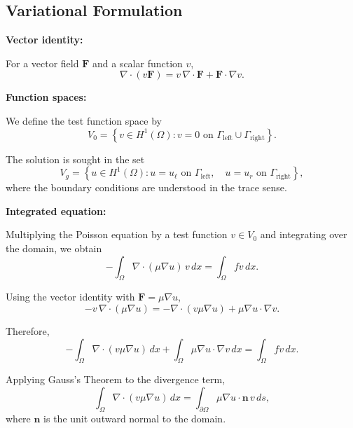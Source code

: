 \documentclass{article}
\begin{document}
	\subsection*{Variational Formulation}
	
	\noindent \textbf{Vector identity:}
	
	For a vector field $\mathbf{F}$ and a scalar function $v$,
	\begin{equation*}
		\nabla\cdot(v\mathbf{F})
		=
		v\,\nabla\cdot\mathbf{F}
		+
		\mathbf{F}\cdot\nabla v.
	\end{equation*}
	
	\noindent \textbf{Function spaces:}
	
	We define the test function space by
	\begin{equation*}
		V_0
		=
		\left\{
		v\in H^1(\Omega):
		v=0 \text{ on }
		\Gamma_{\mathrm{left}}\cup\Gamma_{\mathrm{right}}
		\right\}.
	\end{equation*}
	
	The solution is sought in the set
	\begin{equation*}
		V_g
		=
		\left\{
		u\in H^1(\Omega):
		u=u_\ell \text{ on }\Gamma_{\mathrm{left}},
		\quad
		u=u_r \text{ on }\Gamma_{\mathrm{right}}
		\right\},
	\end{equation*}
	where the boundary conditions are understood in the trace sense.
	
	\noindent \textbf{Integrated equation:}
	
	Multiplying the Poisson equation by a test function $v\in V_0$
	and integrating over the domain, we obtain
	\begin{equation}
		-\int_\Omega
		\nabla\cdot(\mu\nabla u)\,v\,dx
		=
		\int_\Omega fv\,dx.
		\label{eq:poisson-integrada}
	\end{equation}
	
	Using the vector identity with $\mathbf{F}=\mu\nabla u$,
	\begin{equation*}
		-v\,\nabla\cdot(\mu\nabla u)
		=
		-\nabla\cdot(v\mu\nabla u)
		+
		\mu\nabla u\cdot\nabla v.
	\end{equation*}
	
	Therefore,
	\begin{equation*}
		-\int_\Omega
		\nabla\cdot(v\mu\nabla u)\,dx
		+
		\int_\Omega
		\mu\nabla u\cdot\nabla v\,dx
		=
		\int_\Omega fv\,dx.
	\end{equation*}
	
	Applying Gauss's Theorem to the divergence term,
	\begin{equation*}
		\int_\Omega
		\nabla\cdot(v\mu\nabla u)\,dx
		=
		\int_{\partial\Omega}
		\mu\nabla u\cdot\mathbf{n}\,v\,ds,
	\end{equation*}
	where $\mathbf{n}$ is the unit outward normal to the domain.
	
\end{document}
